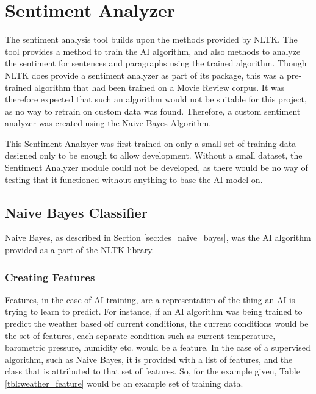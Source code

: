 \section{Sentiment Analyzer}
\label{sec:imp_sentiment_analyzer}

The sentiment analysis tool builds upon the methods provided by NLTK. The tool provides a method to train the AI algorithm, and also methods to analyze the sentiment for sentences and paragraphs using the trained algorithm. Though NLTK does provide a sentiment analyzer as part of its package, this was a pre-trained algorithm that had been trained on a Movie Review corpus. It was therefore expected that such an algorithm would not be suitable for this project, as no way to retrain on custom data was found. Therefore, a custom sentiment analyzer was created using the Naive Bayes Algorithm.

This Sentiment Analzyer was first trained on only a small set of training data designed only to be enough to allow development. Without a small dataset, the Sentiment Analyzer module could not be developed, as there would be no way of testing that it functioned without anything to base the AI model on.
\subsection{Naive Bayes Classifier}
\label{sec:imp_naive_bayes}

Naive Bayes, as described in Section \ref{sec:des_naive_bayes}, was the AI algorithm provided as a part of the NLTK library.

\subsubsection{Creating Features}

Features, in the case of AI training, are a representation of the thing an AI is trying to learn to predict\cite{Mitchell1997}. For instance, if an AI algorithm was being trained to predict the weather based off current conditions, the current conditions would be the set of features, each separate condition such as  current temperature, barometric pressure, humidity etc. would be a feature. In the case of a supervised algorithm, such as Naive Bayes, it is provided with a list of features, and the class that is attributed to that set of features. So, for the example given, Table \ref{tbl:weather_feature} would be an example set of training data.

